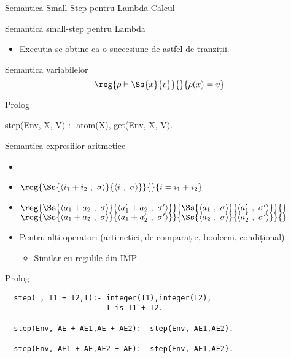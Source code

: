 \documentclass[xcolor=x11names,compress,10pt]{beamer}
\newcommand{\Conf}[2]{\ensuremath{\langle #1\ ,\ #2\rangle}}
\renewcommand{\to}{}
\begin{document}
\begin{section}{Semantica Small-Step pentru Lambda Calcul}
\begin{frame}[fragile]{Semantica small-step pentru Lambda}
\begin{itemize}
  \item Execuția se obține ca o succesiune de astfel de tranziții.
\end{itemize}
\end{frame}

\begin{frame}[fragile]{Semantica variabilelor}
	\[\reg{\rho \vdash \Ss{x}{v}}{}{\rho(x) = v}\]
  \begin{block}{Prolog}
    \begin{asciipl}
      step(Env, X, V) :- atom(X), get(Env, X, V).
    \end{asciipl}
  \end{block}

\end{frame}

  
\begin{frame}[fragile]{Semantica expresiilor aritmetice}
    \begin{itemize}
    \item {}	
     \item[] $\reg{\Ss{\Conf{i_1 + i_2}{\sigma}}{\Conf{i}{\sigma}}}{}{i = i_1 + i_2}$
    
    \item[] $\reg{\Ss{\Conf{a_1 + a_2}{\sigma}}{\Conf{a_1' + a_2}{\sigma'}}}{\Ss{\Conf{a_1}{\sigma}}{\Conf{a_1'}{\sigma'}}}{}$\hfill$\reg{\Ss{\Conf{a_1 + a_2}{\sigma}}\to{\Conf{a_1 + a_2'}{\sigma'}}}{\Ss{\Conf{a_2}{\sigma}}\to {\Conf{a_2'}{\sigma'}}}{}$
 

    \item Pentru alți operatori (artimetici, de comparație, booleeni, condițional)
    \begin{itemize}
        \item  Similar cu regulile din IMP
    \end{itemize}
    \end{itemize}
    
   \begin{block}{Prolog} 
  \begin{verbatim}
  step(_, I1 + I2,I):- integer(I1),integer(I2), 
                       I is I1 + I2.
                              
  step(Env, AE + AE1,AE + AE2):- step(Env, AE1,AE2).
  
  step(Env, AE1 + AE,AE2 + AE):- step(Env, AE1,AE2).
  \end{verbatim}
  \end{block}
  \end{frame}
  



\end{section}
\end{document}
